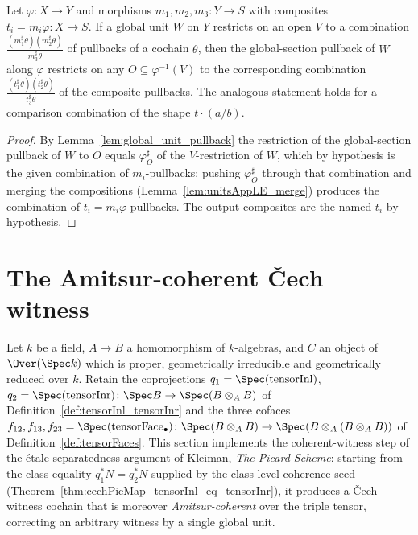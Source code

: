 \begin{lemma}
  \label{lem:unitsAppLE_glued_pullback}
  \leanok
  Let \(\varphi \colon X \to Y\) and morphisms \(m_1, m_2, m_3 \colon Y \to S\) with composites
  \(t_i = m_i \varphi \colon X \to S\). If a global unit \(W\) on \(Y\) restricts on an open
  \(V\) to a combination \(\tfrac{(m_1^{\sharp}\theta)(m_2^{\sharp}\theta)}{m_3^{\sharp}\theta}\)
  of pullbacks of a cochain \(\theta\), then the global-section pullback of \(W\) along
  \(\varphi\) restricts on any \(O \subseteq \varphi^{-1}(V)\) to the corresponding combination
  \(\tfrac{(t_1^{\sharp}\theta)(t_2^{\sharp}\theta)}{t_3^{\sharp}\theta}\) of the composite
  pullbacks. The analogous statement holds for a comparison combination of the shape
  \(t \cdot (a/b)\).
\end{lemma}
\begin{proof}
  \leanok
  By Lemma~\ref{lem:global_unit_pullback} the restriction of the global-section pullback of
  \(W\) to \(O\) equals \(\varphi^{\sharp}_O\) of the \(V\)-restriction of \(W\), which by
  hypothesis is the given combination of \(m_i\)-pullbacks; pushing \(\varphi^{\sharp}_O\)
  through that combination and merging the compositions (Lemma~\ref{lem:unitsAppLE_merge})
  produces the combination of \(t_i = m_i\varphi\) pullbacks. The output composites are the
  named \(t_i\) by hypothesis.
\end{proof}

\section{The Amitsur-coherent \v Cech witness}
\label{sec:coherentWitness}

Let \(k\) be a field, \(A \to B\) a homomorphism of \(k\)-algebras, and \(C\) an object of
\(\Over(\Spec k)\) which is proper, geometrically irreducible and geometrically reduced over
\(k\). Retain the coprojections \(q_1 = \Spec(\mathrm{tensorInl})\),
\(q_2 = \Spec(\mathrm{tensorInr}) \colon \Spec B \to \Spec(B \otimes_A B)\) of
Definition~\ref{def:tensorInl_tensorInr} and the three cofaces
\(f_{12}, f_{13}, f_{23} = \Spec(\mathrm{tensorFace}_{\bullet}) \colon \Spec(B \otimes_A B) \to
\Spec(B \otimes_A (B \otimes_A B))\) of Definition~\ref{def:tensorFaces}. This section
implements the coherent-witness step of the \'etale-separatedness argument of Kleiman,
\emph{The Picard Scheme}: starting from the class equality \(q_1^{*} N = q_2^{*} N\) supplied by
the class-level coherence seed (Theorem~\ref{thm:cechPicMap_tensorInl_eq_tensorInr}), it
produces a \v Cech witness cochain that is moreover \emph{Amitsur-coherent} over the triple
tensor, correcting an arbitrary witness by a single global unit.

